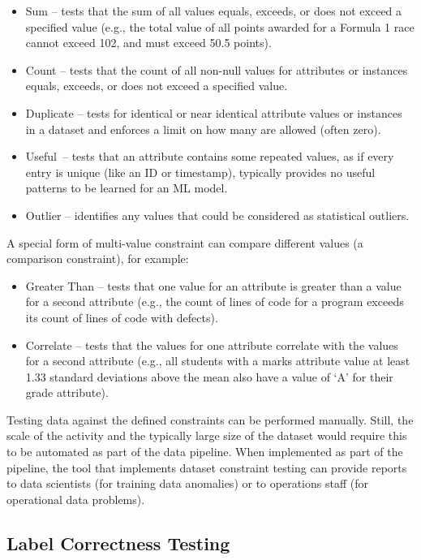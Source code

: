\documentclass[
  letterpaper,
  DIV=11,
  numbers=noendperiod,
  oneside]{scrreprt}
\begin{document}
\begin{tcolorbox}
\begin{itemize}
\item
  Sum -- tests that the sum of all values equals, exceeds, or does not
  exceed a specified value (e.g., the total value of all points awarded
  for a Formula 1 race cannot exceed 102, and must exceed 50.5 points).
\item
  Count -- tests that the count of all non-null values for attributes or
  instances equals, exceeds, or does not exceed a specified value.
\item
  Duplicate -- tests for identical or near identical attribute values or
  instances in a dataset and enforces a limit on how many are allowed
  (often zero).
\item
  Useful~-- tests that an attribute contains some repeated values, as if
  every entry is unique (like an ID or timestamp), typically provides no
  useful patterns to be learned for an ML model.
\item
  Outlier -- identifies any values that could be considered as
  statistical outliers.
\end{itemize}

A special form of multi-value constraint can compare different values (a
comparison constraint), for example:

\begin{itemize}
\item
  Greater Than -- tests that one value for an attribute is greater than
  a value for a second attribute (e.g., the count of lines of code for a
  program exceeds its count of lines of code with defects).
\item
  Correlate -- tests that the values for one attribute correlate with
  the values for a second attribute (e.g., all students with a marks
  attribute value at least 1.33 standard deviations above the mean also
  have a value of `A' for their grade attribute).
\end{itemize}

Testing data against the defined constraints can be performed manually.
Still, the scale of the activity and the typically large size of the
dataset would require this to be automated as part of the data pipeline.
When implemented as part of the pipeline, the tool that implements
dataset constraint testing can provide reports to data scientists (for
training data anomalies) or to operations staff (for operational data
problems).

\subsection{Label Correctness Testing}\label{label-correctness-testing}


\end{tcolorbox}
\end{document}
